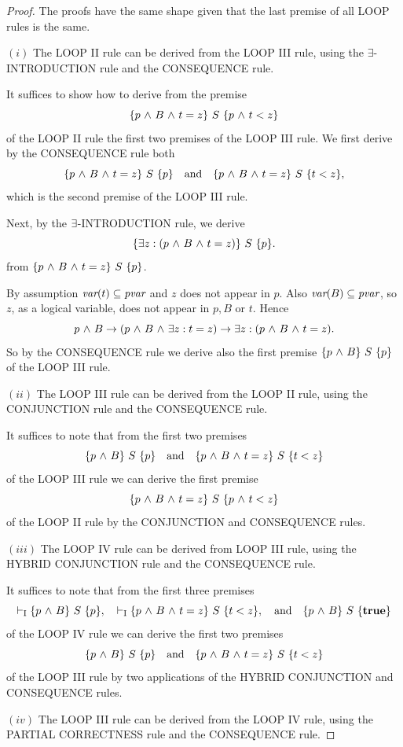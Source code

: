 \documentclass[runningheads]{llncs}       %
\begin{document}
\begin{proof}
The proofs have the same shape given that the last premise of all LOOP rules is the same.
  
\NI
$(i)$ The {\rm LOOP II} rule can be derived from the {\rm LOOP III} rule, using
   the  $\exists$-{\rm INTRODUCTION} rule and the {\rm CONSEQUENCE} rule.
   

It suffices to show how to derive from the premise
\[
  \mbox{$\{{p \mbox{$\ \wedge\ $} B \mbox{$\ \wedge\ $} t=z}\}\ {S}\ \{{p \mbox{$\ \wedge\ $} t<z}\}$}
\]
of the LOOP II rule the first two premises of the LOOP III rule.  We
first derive by the CONSEQUENCE rule both
\[
 \mbox{$\{{p \mbox{$\ \wedge\ $} B \mbox{$\ \wedge\ $} t=z}\}\ {S}\ \{{p}\}$} \quad \mbox{\rm and} \quad
\mbox{$\{{p \mbox{$\ \wedge\ $} B \mbox{$\ \wedge\ $} t=z}\}\ {S}\ \{{t<z}\}$},
\]
which is the second premise of the LOOP III rule.

Next, by the $\mbox{$\exists$}$-INTRODUCTION rule, we derive 
\[
 \mbox{$\{{\mbox{$\exists$} z: (p \mbox{$\ \wedge\ $} B \mbox{$\ \wedge\ $} t=z)}\}\ {S}\ \{{p}\}$}.
\]
from
$\mbox{$\{{p \mbox{$\ \wedge\ $} B \mbox{$\ \wedge\ $} t=z}\}\ {S}\ \{{p}\}$}$.

By assumption $\mbox{\it var}(t)\subseteq \mbox{\it pvar}$ and $z$ does not appear in $p$. Also
$\mbox{\it var}(B)\subseteq \mbox{\it pvar}$, so
$z$, as a logical variable, does not appear
in $p, B$ or $t$. Hence
\[
  p \mbox{$\ \wedge\ $} B \to (p \mbox{$\ \wedge\ $} B \mbox{$\ \wedge\ $} \mbox{$\exists$} z: t=z) \to  \mbox{$\exists$} z: (p \mbox{$\ \wedge\ $} B \mbox{$\ \wedge\ $} t=z).
\]
So by the CONSEQUENCE rule we derive also the first premise
$\mbox{$\{{p \mbox{$\ \wedge\ $} B}\}\ {S}\ \{{p}\}$}$ of the LOOP III rule.
\III

\NI
$(ii)$ The {\rm LOOP III} rule can be derived from the {\rm LOOP II} rule, using
   the {\rm CONJUNCTION} rule and the {\rm CONSEQUENCE} rule.
   
It suffices to note that from the first two premises 
\[
  \mbox{$\{{p \mbox{$\ \wedge\ $} B}\}\ {S}\ \{{p}\}$}\quad \mbox{\rm and} \quad
   \mbox{$\{{p \mbox{$\ \wedge\ $} B \mbox{$\ \wedge\ $} t=z}\}\ {S}\ \{{t<z}\}$}
\]
of the LOOP III rule we can derive the first premise
\[
  \mbox{$\{{p \mbox{$\ \wedge\ $} B \mbox{$\ \wedge\ $} t=z}\}\ {S}\ \{{p \mbox{$\ \wedge\ $} t<z}\}$}
\]
of the LOOP II rule by the CONJUNCTION and CONSEQUENCE rules.
\III

\NI
$(iii)$ 
The {\rm LOOP IV} rule can be derived from {\rm LOOP III} rule, using
the  {\rm HYBRID CONJUNCTION} rule and the {\rm CONSEQUENCE} rule.

It suffices to note that from the first three premises 
\[
  \vdash_{\rm{I}}  \mbox{$\{{p \mbox{$\ \wedge\ $} B}\}\ {S}\ \{{p}\}$},\quad
  \vdash_{\rm{I}}  \mbox{$\{{p \mbox{$\ \wedge\ $} B \mbox{$\ \wedge\ $} t=z}\}\ {S}\ \{{t<z}\}$},\quad
\mbox{\rm and} \quad
 \mbox{$\{{p \mbox{$\ \wedge\ $} B}\}\ {S}\ \{{\mathbf{true}}\}$}
\]
of the LOOP IV rule
we can derive the first two premises
\[
  \mbox{$\{{p \mbox{$\ \wedge\ $} B}\}\ {S}\ \{{p}\}$} \quad
  \mbox{\rm and} \quad \mbox{$\{{p \mbox{$\ \wedge\ $} B \mbox{$\ \wedge\ $} t=z}\}\ {S}\ \{{t<z}\}$}
\]
of the LOOP III rule by two applications of the HYBRID CONJUNCTION and
CONSEQUENCE rules.
\III

\NI
$(iv)$
The {\rm LOOP III} rule can be derived from the {\rm LOOP IV} rule, using 
   the {\rm PARTIAL CORRECTNESS} rule and the {\rm CONSEQUENCE} rule.


\end{proof}
\end{document}
